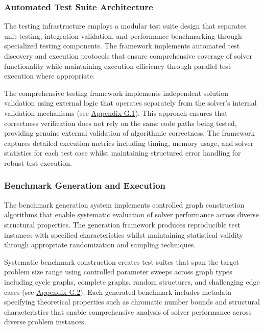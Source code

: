 \subsubsection{Automated Test Suite Architecture}
The testing infrastructure employs a modular test suite design that separates unit testing, integration validation, and performance benchmarking through specialized testing components. The framework implements automated test discovery and execution protocols that ensure comprehensive coverage of solver functionality while maintaining execution efficiency through parallel test execution where appropriate.

The comprehensive testing framework implements independent solution validation using external logic that operates separately from the solver's internal validation mechanisms (see \hyperref[appendix:testing-framework]{Appendix G.1}). This approach ensures that correctness verification does not rely on the same code paths being tested, providing genuine external validation of algorithmic correctness. The framework captures detailed execution metrics including timing, memory usage, and solver statistics for each test case whilst maintaining structured error handling for robust test execution.

\subsubsection{Benchmark Generation and Execution}
The benchmark generation system implements controlled graph construction algorithms that enable systematic evaluation of solver performance across diverse structural properties. The generation framework produces reproducible test instances with specified characteristics whilst maintaining statistical validity through appropriate randomization and sampling techniques.

Systematic benchmark construction creates test suites that span the target problem size range using controlled parameter sweeps across graph types including cycle graphs, complete graphs, random structures, and challenging edge cases (see \hyperref[appendix:benchmark-generation]{Appendix G.2}). Each generated benchmark includes metadata specifying theoretical properties such as chromatic number bounds and structural characteristics that enable comprehensive analysis of solver performance across diverse problem instances.